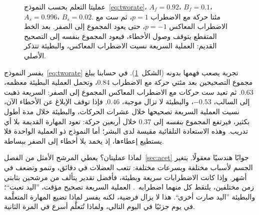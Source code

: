 \begin{figure}[t]
\centering
{}
\caption{عمليتا التعلم بحسب النموذج~\eqref{eq:tworate}، $A_f=0.92$، $B_f=0.1$، $A_s=0.996$، $B_s=0.02$. مئتا حركة مع الاضطراب $p=1$، ثم ست مع الاضطراب المعاكس $p=-1$، حتى يعود المجموع إلى الصفر. بعد الخط المتقطع يتوقف وصول الأخطاء، فيعود المجموع بنفسه إلى التصحيح القديم: العملية السريعة نسيت الاضطراب المعاكس، والبطيئة تتذكر الأصلي.}
\label{fig:tworate}
\end{figure}

يفسر النموذج~\eqref{eq:tworate} تجربة يصعب فهمها بدونه (الشكل~\ref{fig:tworate}). في حسابنا يبلغ مجموع التصحيحين بعد مئتي حركة مع الاضطراب $0.84$، وتحمل العملية البطيئة معظمه، $0.63$. ثم تعيد ست حركات مع الاضطراب المعاكس المجموع إلى الصفر: السريعة ذهبت إلى السالب، $-0.53$، والبطيئة لا تزال موجبة، $0.46$. فإذا توقف الإبلاغ عن الأخطاء الآن، نسيت العملية السريعة تصحيحها خلال عشرات الحركات، والبطيئة خلال مدة أطول بكثير، فيرتفع المجموع \emph{بنفسه} إلى $0.37$ خلال أربعين حركة: تعود المهارة القديمة بلا أي تدريب. وهذه الاستعادة التلقائية مقيسة لدى البشر؛ أما النموذج ذو العملية الواحدة فلا يستطيع إعطاءها، إذ يخمد بلا أخطاء إلى الصفر ببساطة.

لماذا عمليتان؟ يعطي المرشح الأمثل من الفصل~\ref{sec:acet} جوابًا هندسيًا معقولًا. يتغير الجسم لأسباب مختلفة وبسرعات مختلفة: تتعب العضلات في دقائق، وتنمو وتضعف في أشهر. وإذا كانت الاضطرابات سريعة وبطيئة، فأفضل تقدير يتألف من مرشحين بثابتي زمن مختلفين، يلتقط كل منهما اضطرابه~\cite{Kording2007}. العملية السريعة تصحيح مؤقت، ”اليد تعبت“؛ والبطيئة ”اليد صارت أخرى“. هذا لا يزال فرضية، لكنه يفسر لماذا تضيع المهارة المتعلَّمة في يوم جزئيًا في اليوم التالي، ولماذا تُتعلَّم أسرع في المرة الثانية.

